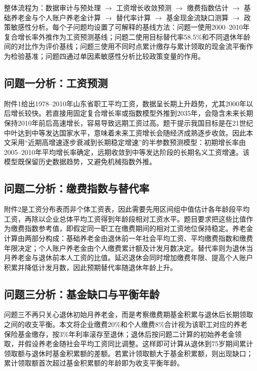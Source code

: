 \documentclass[UTF8,12pt,a4paper]{ctexart}
\begin{document}
整体流程为：数据审计与预处理 $\rightarrow$ 工资增长收敛预测 $\rightarrow$ 缴费指数估计 $\rightarrow$ 基础养老金与个人账户养老金计算 $\rightarrow$ 替代率计算 $\rightarrow$ 基金现金流缺口测算 $\rightarrow$ 政策敏感性分析。每个子问题均设置了可解释的基线方法：问题一使用2000--2010年复合增长率外推作为工资预测基线；问题二使用目标替代率58.5\%和不同退休年龄间的对比作为评价基线；问题三使用不同时点累计缴存与累计领取的现金流平衡作为检验基准；问题四通过单因素敏感性分析比较政策变量的作用。

\subsection{问题一分析：工资预测}
附件1给出1978--2010年山东省职工平均工资，数据呈长期上升趋势，尤其2000年以后增长较快。若直接用固定复合增长率或指数模型外推到2035年，会隐含未来长期保持2010年前后高速增长，容易导致远期工资过高。题干提示我国目标是在21世纪中叶达到中等发达国家水平，意味着未来工资增长会随经济成熟逐步收敛。因此本文采用“近期高增速逐步衰减到长期稳定增速”的半参数预测模型：初期增长率由2005--2010年平均增长率确定，远期收敛到中等发达阶段的长期名义工资增速。该模型既保留历史数据趋势，又避免机械指数外推。

\subsection{问题二分析：缴费指数与替代率}
附件2是工资分布表而非个体工资表，因此需要先用区间组中值估计各年龄段平均工资，再除以企业总体平均工资得到年龄段相对工资水平。题目要求把这些比值作为缴费指数参考值，即假定同一职工在缴费期间的相对工资地位保持稳定。养老金计算由两部分构成：基础养老金由退休前一年社会平均工资、平均缴费指数和缴费年限决定；个人账户养老金由个人缴费累计额及计发月数决定。替代率则为退休当月养老金与退休前本人工资的比值。延迟退休会同时增加缴费年限、提高个人账户积累并降低计发月数，因此预期替代率随退休年龄上升。

\subsection{问题三分析：基金缺口与平衡年龄}
问题三不再只关心退休初始月养老金，而是考察缴费期基金积累与退休后长期领取之间的收支平衡。本文将企业缴费20\%和个人缴费8\%合计视为该职工对应的养老保险基金缴存，按3\%年利率滚存至退休；退休后按问题二计算的初始养老金领取，并假设养老金随社会平均工资同比调整。这样即可计算从退休到75岁期间累计领取额与退休时基金积累额的差额。若累计领取额大于基金积累额，则出现缺口；累计领取额首次超过基金积累额的年龄即为收支平衡年龄。
\end{document}
